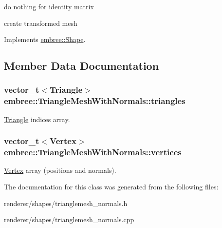 do nothing for identity matrix

create transformed mesh 



Implements \hyperlink{classembree_1_1_shape_a33a3df726fed0bf3e6e36da428091305}{embree::Shape}.



\subsection{Member Data Documentation}
\hypertarget{classembree_1_1_triangle_mesh_with_normals_ae98a0f001155d29277e327eab98f2992}{
\subsubsection[{triangles}]{\setlength{\rightskip}{0pt plus 5cm}vector\_\-t$<${\bf Triangle}$>$ {\bf embree::TriangleMeshWithNormals::triangles}}}
\label{classembree_1_1_triangle_mesh_with_normals_ae98a0f001155d29277e327eab98f2992}


\hyperlink{structembree_1_1_triangle_mesh_with_normals_1_1_triangle}{Triangle} indices array. 

\hypertarget{classembree_1_1_triangle_mesh_with_normals_a25d34ce69475feabd324c012739665a1}{
\subsubsection[{vertices}]{\setlength{\rightskip}{0pt plus 5cm}vector\_\-t$<${\bf Vertex}$>$ {\bf embree::TriangleMeshWithNormals::vertices}}}
\label{classembree_1_1_triangle_mesh_with_normals_a25d34ce69475feabd324c012739665a1}


\hyperlink{structembree_1_1_triangle_mesh_with_normals_1_1_vertex}{Vertex} array (positions and normals). 



The documentation for this class was generated from the following files:\begin{DoxyCompactItemize}
\item 
renderer/shapes/trianglemesh\_\-normals.h\item 
renderer/shapes/trianglemesh\_\-normals.cpp\end{DoxyCompactItemize}
